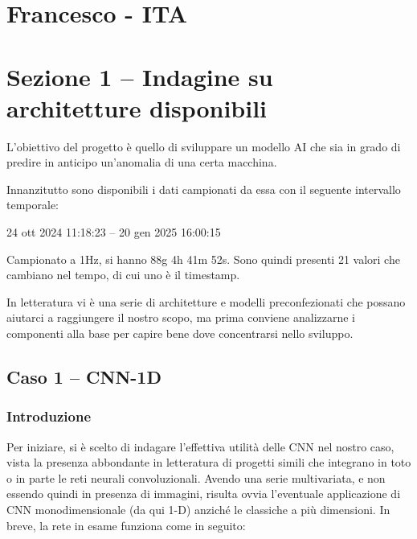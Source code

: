 \section{Francesco - ITA}\label{sec:francesco}


\newenvironment{cverbatim}
  {\begin{center}\begin{minipage}{0.7\linewidth}\begin{verbatim}}
  {\end{verbatim}\end{minipage}\end{center}}



\section{Sezione 1 -- Indagine su architetture disponibili}

L’obiettivo del progetto è quello di sviluppare un modello AI che sia in grado di predire in anticipo un’anomalia di una certa macchina.

Innanzitutto sono disponibili i dati campionati da essa con il seguente intervallo temporale:

\begin{center}
    24 ott 2024 11:18:23 -- 20 gen 2025 16:00:15
\end{center}


Campionato a 1Hz, si hanno 88g 4h 41m 52s. Sono quindi presenti 21 valori che cambiano nel tempo, di cui uno è il timestamp.

In letteratura vi è una serie di architetture e modelli preconfezionati che possano aiutarci a raggiungere il nostro scopo, ma prima conviene analizzarne i componenti alla base per capire bene dove concentrarsi nello sviluppo.

\subsection{Caso 1 -- CNN-1D}

\subsubsection{Introduzione}

Per iniziare, si è scelto di indagare l’effettiva utilità delle CNN nel nostro caso, vista la presenza abbondante in letteratura di progetti simili che integrano in toto o in parte le reti neurali convoluzionali. 
Avendo una serie multivariata, e non essendo quindi in presenza di immagini, risulta ovvia l’eventuale applicazione di CNN monodimensionale (da qui 1-D) anziché le classiche a più dimensioni. In breve, la rete in esame funziona come in seguito:


